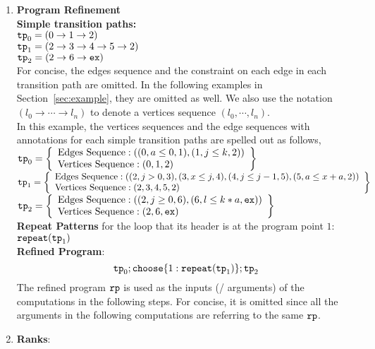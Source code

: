 \begin{enumerate}
    \item \textbf{Program Refinement}
    \\
    \textbf{Simple transition paths:}
      \\
  $\mathtt{tp}_0 =  (0 \to 1 \to 2)$
  \\
  $\mathtt{tp}_1 =  (2 \to 3 \to 4 \to 5 \to 2)$
  \\
  $\mathtt{tp}_2 = (2 \to 6 \to \mathtt{ex})$
  \\
  For concise, the edges sequence and the constraint on each edge in
  each transition path are omitted.
  In the following examples in Section~\ref{sec:example}, they 
  are omitted as well.
  We also use the notation $(l_0 \to \cdots \to l_n)$ to denote a vertices sequence $(l_0, \cdots, l_n)$.
  \\
  In this example, the vertices sequences and the edge sequences with annotations
  for each simple transition paths are spelled out as follows,
  \\
  $\tpath_0 =  
    \left\{ \begin{array}{l}
    \text{Edges Sequence}: ((0, a \leq 0, 1), (1, j \leq k, 2))
    \\
    \text{Vertices Sequence}: (0, 1, 2)
    \end{array}\right\}
  $
  \\
  $\tpath_1 =  
  \left\{ \begin{array}{l}
    \text{Edges Sequence}: ((2, j > 0, 3), (3, x \leq j, 4), (4, j \leq j - 1, 5), (5, a \leq x + a, 2))
    \\
    \text{Vertices Sequence}: (2, 3, 4, 5, 2)
    \end{array}\right\}
  $
  \\
  $\tpath_2 = 
  \left\{ \begin{array}{l}
    \text{Edges Sequence}: ((2, j \geq 0, 6), (6, l \leq k*a, \lex))
    \\
    \text{Vertices Sequence}: (2, 6, \lex)
    \end{array}\right\}
    $
  \\
  \textbf{Repeat Patterns} for the loop that its header is
  at the program point $1$: $\mathtt{repeat}(\mathtt{tp}_1)$
  \\
  \textbf{Refined Program}:
  \[
    \tpath_0 ; \rpchoose{1: \rprepeat(\tpath_1)}; \tpath_2
  \]
  The refined program $\mathtt{rp}$ is used as the inputs (/ arguments) of the computations in the following steps.
  For concise, it is omitted since all the arguments in the following computations are referring to the same $\mathtt{rp}$.
  \item \textbf{Ranks}:

\end{enumerate}
